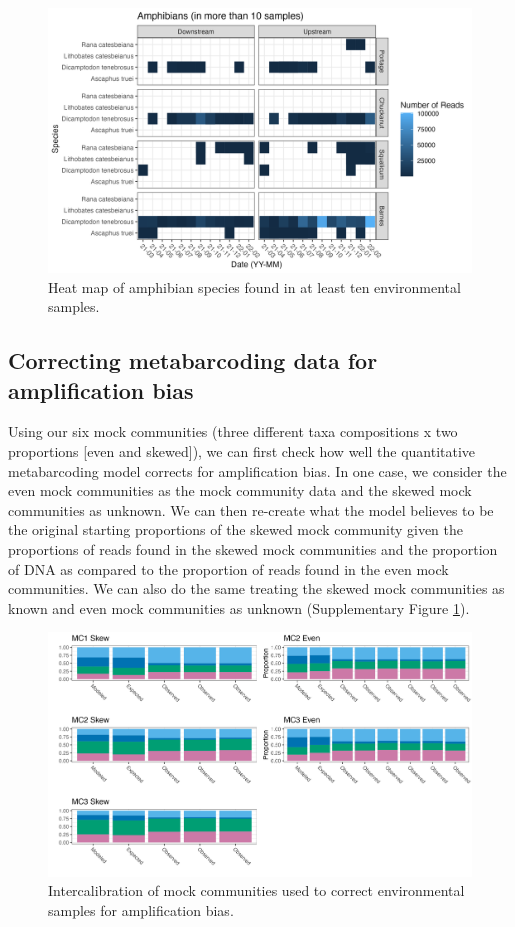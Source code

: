 \documentclass[
]{article}
\begin{document}
\begin{figure}
\centering
\includegraphics{../Output/SupplementalFigures/amphibs.png}
\caption{Heat map of amphibian species found in at least ten
environmental samples.}
\end{figure}

\hypertarget{correcting-metabarcoding-data-for-amplification-bias}{%
\subsection{Correcting metabarcoding data for amplification
bias}\label{correcting-metabarcoding-data-for-amplification-bias}}

Using our six mock communities (three different taxa compositions x two
proportions {[}even and skewed{]}), we can first check how well the
quantitative metabarcoding model corrects for amplification bias. In one
case, we consider the even mock communities as the mock community data
and the skewed mock communities as unknown. We can then re-create what
the model believes to be the original starting proportions of the skewed
mock community given the proportions of reads found in the skewed mock
communities and the proportion of DNA as compared to the proportion of
reads found in the even mock communities. We can also do the same
treating the skewed mock communities as known and even mock communities
as unknown (Supplementary Figure \ref{fig:intercal}).

\begin{figure}
\centering
\includegraphics{../Output/SupplementalFigures/mock_internal_calibration.png}
\caption{Intercalibration of mock communities used to correct
environmental samples for amplification bias.\label{fig:intercal}}
\end{figure}
\end{document}

